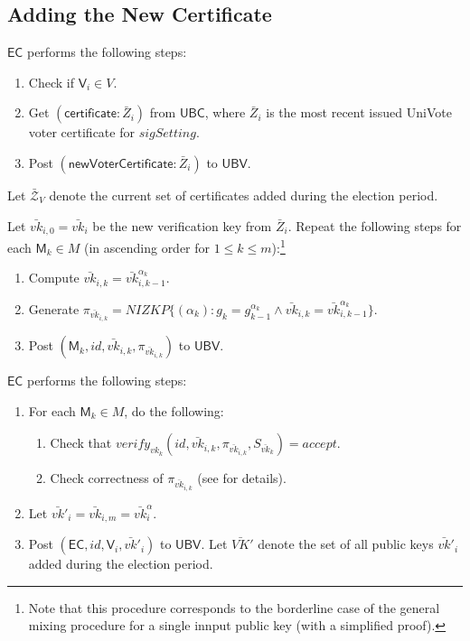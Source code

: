 \documentclass[bibtotoc,halfparskip,oneside]{scrreprt}
\newcommand{\eid}{\mathit{id}\xspace}
\newcommand{\vk}[1]{\mathit{vk}_{#1}\xspace}
\newcommand{\vkbar}[1]{\bar{\mathit{vk}}_{#1}\xspace}
\newcommand{\vkbarprime}[1]{\bar{\mathit{vk}}'_{#1}\xspace}
\newcommand{\EC}{\ensuremath{\mathsf{EC}}\xspace}
\newcommand{\UBC}{\ensuremath{\mathsf{UBC}}\xspace}
\newcommand{\UBV}{\ensuremath{\mathsf{UBV}}\xspace}
\newcommand{\Mixer}[1]{\ensuremath{\mathsf{M}_{#1}}\xspace}
\newcommand{\Voter}[1]{\ensuremath{\mathsf{V}_{#1}}\xspace}
\begin{document}
\subsection{Adding the New Certificate}\label{adding}

\EC performs the following steps:
\begin{enumerate}
	\item Check if $\Voter{i}\in V$.
	\item Get $(\mathsf{certificate}:\bar{Z}_i)$ from \UBC, where $\bar{Z}_i$ is the most recent issued UniVote voter certificate for $\mathit{sigSetting}$.
	\item Post $(\mathsf{newVoterCertificate}:\bar{Z}_i)$ to \UBV. 
\end{enumerate}
Let $\bar{\mathcal{Z}}_V$ denote the current set of certificates added during the election period.

Let $\vkbar{i,0}=\vkbar{i}$ be the new verification key from $\bar{Z}_i$. Repeat the following steps for each $\Mixer{k}\in M$ (in ascending order for $1\leq k\leq m$):\footnote{Note that this procedure corresponds to the borderline case of the general mixing procedure for a single innput public key (with a simplified proof).}
\begin{enumerate}[resume]
	\item Compute $\vkbar{i,k}=\vkbar{i,k-1}^{\alpha_k}$.
\	\item Generate $\pi_{\vkbar{i,k}}=\mathit{NIZKP}\{(\alpha_k):g_k=g_{k-1}^{\alpha_k}\wedge\vkbar{i,k}=\vkbar{i,k-1}^{\alpha_k}\}$.
	\item Post $(\Mixer{k},\eid,\vkbar{i,k},\pi_{\vkbar{i,k}})$ to \UBV.
\end{enumerate}

\EC performs the following steps:
\begin{enumerate}[resume]
	\item For each $\Mixer{k}\in M$, do the following:
	\begin{enumerate}
		\item Check that $\mathit{verify}_{\vk{k}}(\eid,\vkbar{i,k},\pi_{\vkbar{i,k}},S_{\vkbar{k}})=\mathit{accept}$.
		\item Check correctness of $\pi_{\vkbar{i,k}}$ (see  for details).
	\end{enumerate}
	\item Let $\vkbarprime{i}=\vkbar{i,m}=\vkbar{i}^{\alpha}$.
	\item Post $(\EC,\eid,\Voter{i},\vkbarprime{i})$ to \UBV. Let $\bar{\mathit{VK}}'$ denote the set of all public keys $\vkbarprime{i}$ added during the election period.
\end{enumerate}
\end{document}
